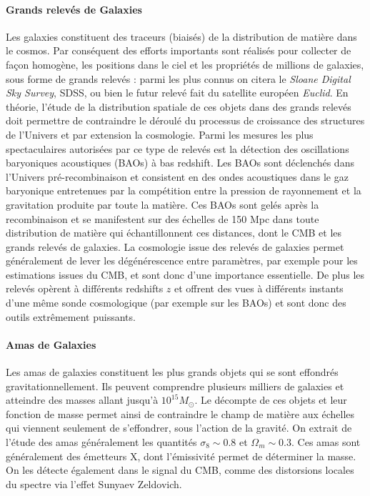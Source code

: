 \paragraph{Grands relevés de Galaxies}
Les galaxies  constituent des traceurs (biaisés) de la distribution de matière dans le cosmos. Par conséquent des efforts importants sont réalisés pour collecter de façon homogène, les positions dans le ciel et les propriétés de millions de galaxies, sous forme de grands relevés : parmi les plus connus on citera le \textit{Sloane Digital Sky Survey}, SDSS, ou bien le futur relevé fait du satellite européen \textit{Euclid}. En théorie, l'étude de la distribution spatiale de ces objets dans des grands relevés doit permettre de contraindre le déroulé du processus de croissance des structures de l'Univers et par extension la cosmologie. Parmi les mesures les plus spectaculaires autorisées par ce type de relevés est la détection des oscillations baryoniques acoustiques (BAOs) à bas redshift. Les BAOs sont déclenchés dans l'Univers pré-recombinaison et consistent en des ondes acoustiques dans le gaz baryonique entretenues par la compétition entre la pression de rayonnement et la gravitation produite par toute la matière. Ces BAOs sont gelés après la recombinaison et se manifestent sur des échelles de 150 Mpc dans toute distribution de matière qui échantillonnent ces distances, dont le CMB et les grands relevés de galaxies.  La cosmologie issue des relevés de galaxies permet généralement de lever les dégénérescence entre paramètres, par exemple pour les estimations issues du CMB, et sont donc d'une importance essentielle. De plus les relevés opèrent à différents redshifts $z$ et offrent  des vues à différents instants d'une même sonde cosmologique (par exemple sur les BAOs) et sont donc des outils extrêmement puissants.

\paragraph{Amas de Galaxies}
Les amas de galaxies constituent les plus grands objets qui se sont effondrés gravitationnellement. Ils peuvent comprendre plusieurs milliers de galaxies et atteindre des masses allant jusqu'à $10^{15} M_\odot$. Le décompte de ces objets et leur fonction de masse permet ainsi de contraindre le champ de matière aux échelles qui viennent seulement de s'effondrer, sous l'action de la gravité. On extrait de l'étude des amas généralement les quantités $\sigma_8\sim 0.8$ et $\Omega_m\sim0.3$. Ces amas sont généralement des émetteurs X, dont l'émissivité permet de déterminer la masse. On les détecte également dans le signal du CMB, comme des distorsions locales du spectre via l'effet Sunyaev Zeldovich.

